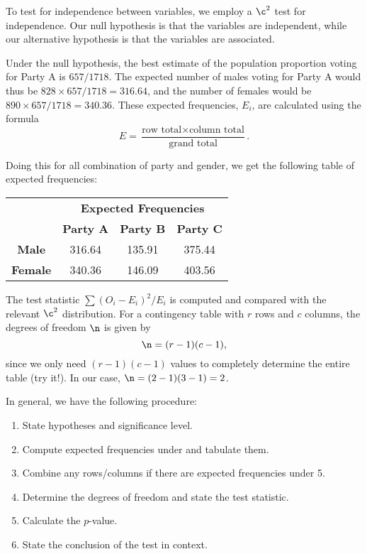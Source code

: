 To test for independence between variables, we employ a $\c^2$ test for independence. Our null hypothesis is that the variables are independent, while our alternative hypothesis is that the variables are associated.

Under the null hypothesis, the best estimate of the population proportion voting for Party A is $657/1718$. The expected number of males voting for Party A would thus be $828 \times 657/1718 = 316.64$, and the number of females would be $890 \times 657/1718 = 340.36$. These expected frequencies, $E_i$, are calculated using the formula \[E = \frac{\text{row total} \times \text{column total}}{\text{grand total}}.\]

Doing this for all combination of party and gender, we get the following table of expected frequencies:

\begin{table}[H]
    \centering
    \begin{tabular}{c|ccc|}
    \cline{2-4}
    & \multicolumn{3}{c|}{\textbf{Expected Frequencies}} \\ \cline{2-4} 
    & \multicolumn{1}{c|}{\textbf{Party A}} & \multicolumn{1}{c|}{\textbf{Party B}} & \textbf{Party C} \\ \hline
    \multicolumn{1}{|c|}{\textbf{Male}} & \multicolumn{1}{c|}{316.64} & \multicolumn{1}{c|}{135.91} & 375.44 \\ \hline
    \multicolumn{1}{|c|}{\textbf{Female}} & \multicolumn{1}{c|}{340.36} & \multicolumn{1}{c|}{146.09} & 403.56 \\ \hline
    \end{tabular}
\end{table}

The test statistic $\sum (O_i - E_i)^2/E_i$ is computed and compared with the relevant $\c^2$ distribution. For a contingency table with $r$ rows and $c$ columns, the degrees of freedom $\n$ is given by \[\n = (r-1)(c-1),\] since we only need $(r-1)(c-1)$ values to completely determine the entire table (try it!). In our case, $\n = (2-1)(3-1) = 2$.

In general, we have the following procedure:

\begin{recipe}
    \phantom{.}
    \renewcommand{\theenumi}{\arabic{enumi}.}
    \begin{enumerate}
        \item State hypotheses and significance level.
        \item Compute expected frequencies under \nullhyp{} and tabulate them.
        \item Combine any rows/columns if there are expected frequencies under 5.
        \item Determine the degrees of freedom and state the test statistic.
        \item Calculate the $p$-value.
        \item State the conclusion of the test in context.
    \end{enumerate}
    \renewcommand{\theenumi}{(\alph{enumi})}
\end{recipe}